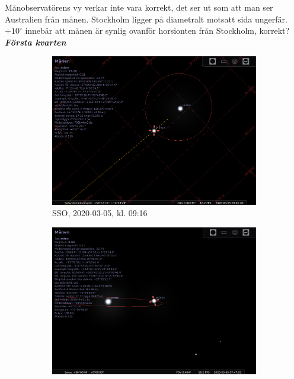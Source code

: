 \documentclass[./exercises.tex]{subfiles}
\begin{document}
\begin{itemize}
Månobservatörens vy verkar inte vara korrekt, det ser ut som att man
ser Australien från månen. Stockholm ligger på diametralt
motsatt sida ungerfär.$+10^\circ$ innebär att månen är synlig ovanför
horsionten från Stockholm, korrekt?
\newpage
\textit{\textbf{Första kvarten}}
\begin{figure}[H]
     \centering
     \begin{subfigure}[b]{0.45\textwidth}
         \centering
         \includegraphics[width=\textwidth]{Stellarium1/FirstQuarter/stellarium-000.png}
         \caption{SSO, 2020-03-05, kl. 09:16}
         \label{fig:y equals x}
     \end{subfigure}
     \hfill
     \begin{subfigure}[b]{0.45\textwidth}
         \centering
         \includegraphics[width=\textwidth]{Stellarium1/FirstQuarter/stellarium-001.png}

\end{subfigure}
\end{figure}
\end{itemize}
\end{document}
